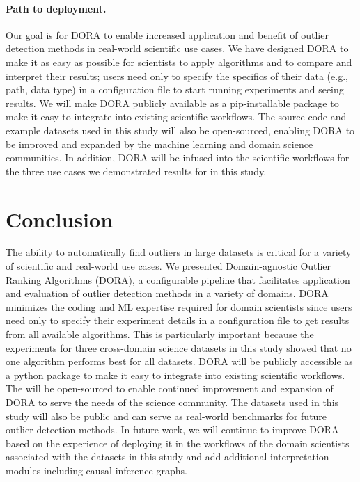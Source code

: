 \documentclass[letterpaper]{article} %
\begin{document}
\paragraph{Path to deployment.} 
Our goal is for DORA to enable increased application and benefit of
outlier detection methods in real-world scientific use cases. We have 
designed DORA to make it as easy as possible for scientists to apply
algorithms and to compare and interpret their results; users need only
to specify the specifics of their data (e.g., path, data type) in a 
configuration file to start running experiments and seeing results. We will
make DORA publicly available as a pip-installable package to make it
easy to integrate into existing scientific workflows. 
The source code and example datasets used in this study will also be 
open-sourced, enabling DORA to be improved and expanded by the 
machine learning and domain science communities. 
In addition, DORA will be infused into the scientific workflows for the
three use cases we demonstrated results for in this study.

\section{Conclusion}
The ability to automatically find outliers in large datasets is critical
for a variety of scientific and real-world use cases. 
We presented Domain-agnostic Outlier Ranking Algorithms (DORA),
a configurable pipeline that facilitates application and evaluation of
outlier detection methods in a variety of domains. DORA minimizes the
coding and ML expertise required for domain scientists since users
need only to specify their experiment details in a configuration file
to get results from all available algorithms. This is particularly important
because the experiments for three cross-domain science datasets in this
study showed that no one algorithm performs best for all datasets.
DORA will be publicly accessible as a python package to make it
easy to integrate into existing scientific workflows. 
The will be
open-sourced to enable continued improvement and expansion of DORA
to serve the needs of the science community. The datasets used in this
study will also be public and can serve as real-world benchmarks 
for future outlier detection methods. In future work, we will
continue to improve DORA based on the experience of deploying it in
the workflows of the domain scientists associated with the datasets in
this study and add additional interpretation modules 
including causal inference graphs.
\end{document}
